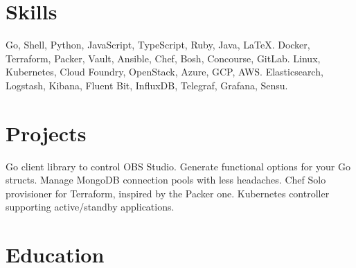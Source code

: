 \documentclass[10pt,letterpaper,sans]{moderncv} %
\begin{document}
\section{Skills}
  {Go, Shell, Python, JavaScript, TypeScript, Ruby, Java, \LaTeX. \yeahigotsweskills}
  {Docker, Terraform, Packer, Vault, Ansible, Chef, Bosh, Concourse, GitLab.}
  {Linux, Kubernetes, Cloud Foundry, OpenStack, Azure, GCP, AWS. \yeahigotsreskills}
  {Elasticsearch, Logstash, Kibana, Fluent Bit, InfluxDB, Telegraf, Grafana, Sensu.}

\section{Projects}
  {Go client library to control OBS Studio.}
  {Generate functional options for your Go structs.}
  {Manage MongoDB connection pools with less headaches.}
  {Chef Solo provisioner for Terraform, inspired by the Packer one.}
  {Kubernetes controller supporting active/standby applications.}

\section{Education}
\end{document}
